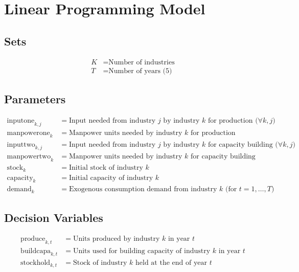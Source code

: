 \documentclass{article}
\begin{document}
\section*{Linear Programming Model}

\subsection*{Sets}
\begin{align*}
K & = \text{Number of industries} \\
T & = \text{Number of years (5)}
\end{align*}

\subsection*{Parameters}
\begin{align*}
\text{inputone}_{k,j} & = \text{Input needed from industry } j \text{ by industry } k \text{ for production (\(\forall k, j\))} \\
\text{manpowerone}_{k} & = \text{Manpower units needed by industry } k \text{ for production} \\
\text{inputtwo}_{k,j} & = \text{Input needed from industry } j \text{ by industry } k \text{ for capacity building (\(\forall k, j\))} \\
\text{manpowertwo}_{k} & = \text{Manpower units needed by industry } k \text{ for capacity building} \\
\text{stock}_{k} & = \text{Initial stock of industry } k \\
\text{capacity}_{k} & = \text{Initial capacity of industry } k \\
\text{demand}_{k} & = \text{Exogenous consumption demand from industry } k \text{ (for \(t = 1, \ldots, T\))}
\end{align*}

\subsection*{Decision Variables}
\begin{align*}
\text{produce}_{k,t} & = \text{Units produced by industry } k \text{ in year } t \\
\text{buildcapa}_{k,t} & = \text{Units used for building capacity of industry } k \text{ in year } t \\
\text{stockhold}_{k,t} & = \text{Stock of industry } k \text{ held at the end of year } t
\end{align*}
\end{document}
